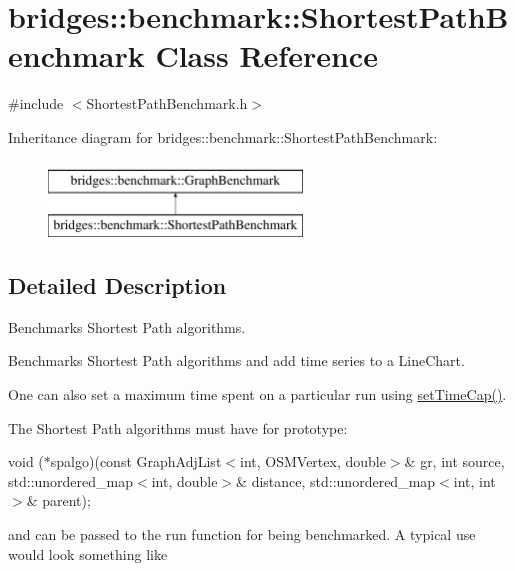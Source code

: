 \hypertarget{classbridges_1_1benchmark_1_1_shortest_path_benchmark}{}\section{bridges\+::benchmark\+::Shortest\+Path\+Benchmark Class Reference}
\label{classbridges_1_1benchmark_1_1_shortest_path_benchmark}


{\ttfamily \#include $<$Shortest\+Path\+Benchmark.\+h$>$}

Inheritance diagram for bridges\+::benchmark\+::Shortest\+Path\+Benchmark\+:\begin{figure}[H]
\begin{center}
\leavevmode
\includegraphics[height=2.000000cm]{classbridges_1_1benchmark_1_1_shortest_path_benchmark}
\end{center}
\end{figure}


\subsection{Detailed Description}
Benchmarks Shortest Path algorithms. 

Benchmarks Shortest Path algorithms and add time series to a Line\+Chart.

One can also set a maximum time spent on a particular run using \mbox{\hyperlink{classbridges_1_1benchmark_1_1_graph_benchmark_a56934eb2789e54c088e7b4423c3a7456}{set\+Time\+Cap()}}.

The Shortest Path algorithms must have for prototype\+:

void ($\ast$spalgo)(const Graph\+Adj\+List$<$int, O\+S\+M\+Vertex, double$>$\& gr, int source, std\+::unordered\+\_\+map$<$int, double$>$\& distance, std\+::unordered\+\_\+map$<$int, int$>$\& parent);

and can be passed to the run function for being benchmarked. A typical use would look something like


\begin{DoxyCode}{0}
\end{DoxyCode}


